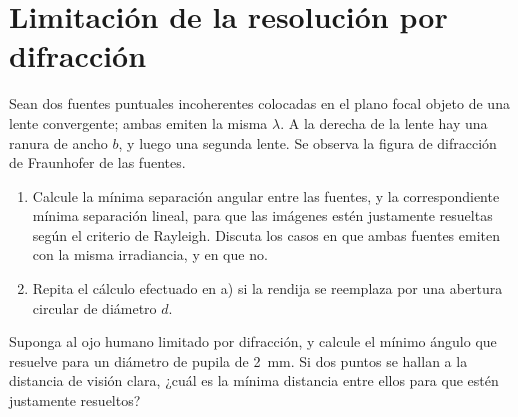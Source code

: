 \section*{Limitación de la resolución por difracción}

\item Sean dos fuentes puntuales incoherentes colocadas en el plano focal objeto de una lente convergente; ambas emiten la misma $\lambda$.
A la derecha de la lente hay una ranura de ancho $b$, y luego una segunda lente.
Se observa la figura de difracción de Fraunhofer de las fuentes.
\begin{enumerate}
	\item Calcule la mínima separación angular entre las fuentes, y la correspondiente mínima separación lineal, para que las imágenes estén justamente resueltas según el criterio de Rayleigh.
	Discuta los casos en que ambas fuentes emiten con la misma irradiancia, y en que no. 
	\item Repita el cálculo efectuado en a) si la rendija se reemplaza por una abertura circular de diámetro $d$.
\end{enumerate}



\item Suponga al ojo humano limitado por difracción, y calcule el mínimo ángulo que resuelve para un diámetro de pupila de \SI{2}{\milli\metre}.
Si dos puntos se hallan a la distancia de visión clara, ¿cuál es la mínima distancia entre ellos para que estén justamente resueltos?
